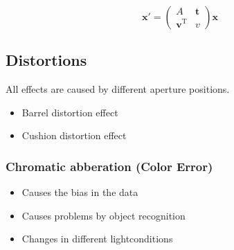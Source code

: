 \[
\mathbf{x}' = 
\begin{pmatrix}
A & \mathbf{t} \\
\mathbf{v}^\mathrm{T} & v
\end{pmatrix}
\mathbf{x}
\]

\subsection{Distortions}
All effects are caused by different aperture
positions.
\begin{itemize}
    \item Barrel distortion effect
    \item Cushion distortion effect
\end{itemize}

\subsubsection{Chromatic abberation (Color Error)}
\begin{itemize}
    \item Causes the bias in the data
    \item Causes problems by object recognition
    \item Changes in different lightconditions
\end{itemize}
